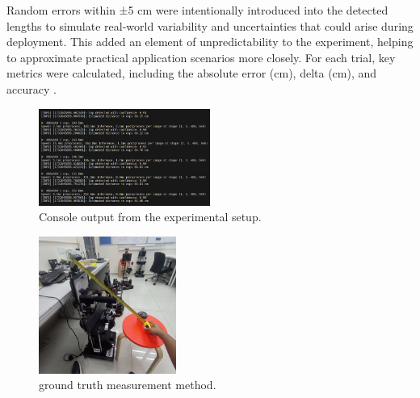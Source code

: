 Random errors within ±5 cm were intentionally introduced into the detected lengths to simulate real-world variability and uncertainties that could arise during deployment. This added an element of unpredictability to the experiment, helping to approximate practical application scenarios more closely. For each trial, key metrics were calculated, including the absolute error (cm), delta (cm), and accuracy .

\begin{figure}[h]
  \centering
  \includegraphics[width=0.5\textwidth]{content/console.png}
  \caption{Console output from the experimental setup.}
  \label{fig:experiment-setup-console}
\end{figure}

\begin{figure}[h]
  \centering
  \includegraphics[width=0.4\textwidth]{content/ground Truth.jpg}
  \caption{ground truth measurement method.}
  \label{fig:ground-truth-method}
\end{figure}

